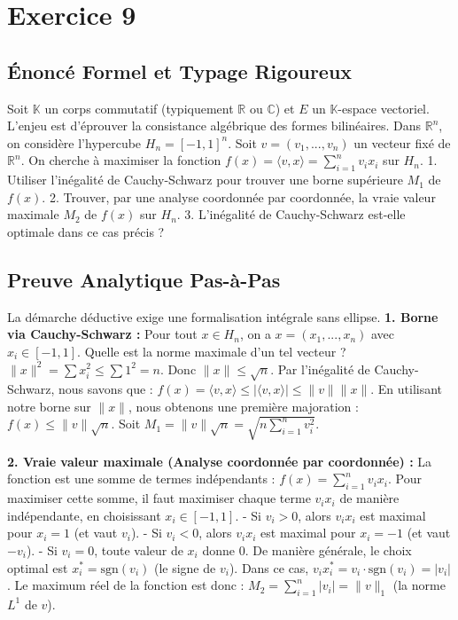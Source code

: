\documentclass[11pt,a4paper]{report}
\begin{document}
\section{Exercice 9}


\subsection*{Énoncé Formel et Typage Rigoureux}
Soit $\mathbb{K}$ un corps commutatif (typiquement $\mathbb{R}$ ou $\mathbb{C}$) et $E$ un $\mathbb{K}$-espace vectoriel. L'enjeu est d'éprouver la consistance algébrique des formes bilinéaires.
Dans $\mathbb{R}^n$, on considère l'hypercube $H_n = [-1, 1]^n$. Soit $v = (v_1, ..., v_n)$ un vecteur fixé de $\mathbb{R}^n$.
On cherche à maximiser la fonction $f(x) = \langle v, x \rangle = \sum_{i=1}^n v_i x_i$ sur $H_n$.
1. Utiliser l'inégalité de Cauchy-Schwarz pour trouver une borne supérieure $M_1$ de $f(x)$.
2. Trouver, par une analyse coordonnée par coordonnée, la vraie valeur maximale $M_2$ de $f(x)$ sur $H_n$.
3. L'inégalité de Cauchy-Schwarz est-elle optimale dans ce cas précis ?

\subsection*{Preuve Analytique Pas-à-Pas}
La démarche déductive exige une formalisation intégrale sans ellipse.
\textbf{1. Borne via Cauchy-Schwarz :}
Pour tout $x \in H_n$, on a $x = (x_1, ..., x_n)$ avec $x_i \in [-1, 1]$.
Quelle est la norme maximale d'un tel vecteur ?
$\|x\|^2 = \sum x_i^2 \le \sum 1^2 = n$. Donc $\|x\| \le \sqrt{n}$.
Par l'inégalité de Cauchy-Schwarz, nous savons que :
$f(x) = \langle v, x \rangle \le |\langle v, x \rangle| \le \|v\| \|x\|$.
En utilisant notre borne sur $\|x\|$, nous obtenons une première majoration :
$f(x) \le \|v\| \sqrt{n}$.
Soit $M_1 = \|v\| \sqrt{n} = \sqrt{n \sum_{i=1}^n v_i^2}$.

\textbf{2. Vraie valeur maximale (Analyse coordonnée par coordonnée) :}
La fonction est une somme de termes indépendants : $f(x) = \sum_{i=1}^n v_i x_i$.
Pour maximiser cette somme, il faut maximiser chaque terme $v_i x_i$ de manière indépendante, en choisissant $x_i \in [-1, 1]$.
- Si $v_i > 0$, alors $v_i x_i$ est maximal pour $x_i = 1$ (et vaut $v_i$).
- Si $v_i < 0$, alors $v_i x_i$ est maximal pour $x_i = -1$ (et vaut $-v_i$).
- Si $v_i = 0$, toute valeur de $x_i$ donne $0$.
De manière générale, le choix optimal est $x_i^* = \text{sgn}(v_i)$ (le signe de $v_i$).
Dans ce cas, $v_i x_i^* = v_i \cdot \text{sgn}(v_i) = |v_i|$.
Le maximum réel de la fonction est donc :
$M_2 = \sum_{i=1}^n |v_i| = \|v\|_1$ (la norme $L^1$ de $v$).
\end{document}
